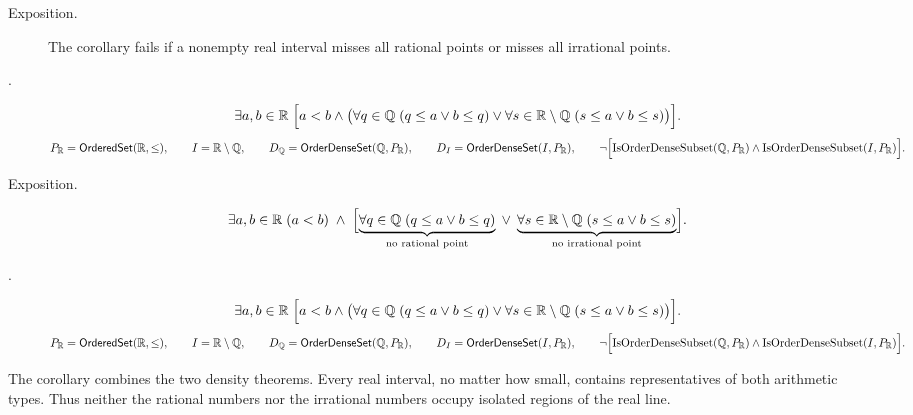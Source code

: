 \begin{remark*}
\begin{description}
\item[Exposition.]
The corollary fails if a nonempty real interval misses all rational points or misses all irrational points.


  \item[.]
  \[
\exists a,b\in\mathbb{R}\;
\Bigl[
a<b\land
\bigl(
\forall q\in\mathbb{Q}\;(q\le a\lor b\le q)
\lor
\forall s\in\mathbb{R}\setminus\mathbb{Q}\;(s\le a\lor b\le s)
\bigr)
\Bigr].
\]
\[
P_{\mathbb{R}}=\mathsf{OrderedSet}(\mathbb{R},\leq),\qquad I=\mathbb{R}\setminus\mathbb{Q},\qquad
D_{\mathbb{Q}}=\mathsf{OrderDenseSet}(\mathbb{Q},P_{\mathbb{R}}),\qquad
D_I=\mathsf{OrderDenseSet}(I,P_{\mathbb{R}}),\qquad
\neg\Bigl[
\operatorname{IsOrderDenseSubset}(\mathbb{Q},P_{\mathbb{R}})
\land
\operatorname{IsOrderDenseSubset}(I,P_{\mathbb{R}})
\Bigr].
\]
\end{description}
\end{remark*}

\begin{remark*}
\begin{description}
\item[Exposition.]
\[
\exists a,b\in\mathbb{R}\;(a<b)
\;\land\;
\Bigl[
\underbrace{\forall q\in\mathbb{Q}\;(q\le a\lor b\le q)}_{\text{no rational point}}
\;\lor\;
\underbrace{\forall s\in\mathbb{R}\setminus\mathbb{Q}\;(s\le a\lor b\le s)}_{\text{no irrational point}}
\Bigr].
\]


  \item[.]
  \[
\exists a,b\in\mathbb{R}\;
\Bigl[
a<b\land
\bigl(
\forall q\in\mathbb{Q}\;(q\le a\lor b\le q)
\lor
\forall s\in\mathbb{R}\setminus\mathbb{Q}\;(s\le a\lor b\le s)
\bigr)
\Bigr].
\]
\[
P_{\mathbb{R}}=\mathsf{OrderedSet}(\mathbb{R},\leq),\qquad I=\mathbb{R}\setminus\mathbb{Q},\qquad
D_{\mathbb{Q}}=\mathsf{OrderDenseSet}(\mathbb{Q},P_{\mathbb{R}}),\qquad
D_I=\mathsf{OrderDenseSet}(I,P_{\mathbb{R}}),\qquad
\neg\Bigl[
\operatorname{IsOrderDenseSubset}(\mathbb{Q},P_{\mathbb{R}})
\land
\operatorname{IsOrderDenseSubset}(I,P_{\mathbb{R}})
\Bigr].
\]
\end{description}
\end{remark*}

\begin{remark*}[Interpretation]
The corollary combines the two density theorems. Every real interval, no matter how small, contains representatives of both arithmetic types. Thus neither the rational numbers nor the irrational numbers occupy isolated regions of the real line.
\end{remark*}

